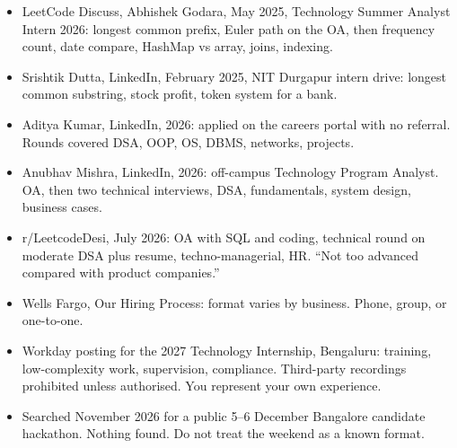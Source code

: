 \documentclass[a4paper,9.5pt]{extarticle}
\begin{document}
\begin{itemize}
  \item LeetCode Discuss, Abhishek Godara, May 2025, Technology Summer Analyst Intern 2026: longest common prefix, Euler path on the OA, then frequency count, date compare, HashMap vs array, joins, indexing.
  \item Srishtik Dutta, LinkedIn, February 2025, NIT Durgapur intern drive: longest common substring, stock profit, token system for a bank.
  \item Aditya Kumar, LinkedIn, 2026: applied on the careers portal with no referral. Rounds covered DSA, OOP, OS, DBMS, networks, projects.
  \item Anubhav Mishra, LinkedIn, 2026: off-campus Technology Program Analyst. OA, then two technical interviews, DSA, fundamentals, system design, business cases.
  \item r/LeetcodeDesi, July 2026: OA with SQL and coding, technical round on moderate DSA plus resume, techno-managerial, HR. ``Not too advanced compared with product companies.''
  \item Wells Fargo, Our Hiring Process: format varies by business. Phone, group, or one-to-one.
  \item Workday posting for the 2027 Technology Internship, Bengaluru: training, low-complexity work, supervision, compliance. Third-party recordings prohibited unless authorised. You represent your own experience.
  \item Searched November 2026 for a public 5--6 December Bangalore candidate hackathon. Nothing found. Do not treat the weekend as a known format.
\end{itemize}

\vspace{2mm}
\end{document}
